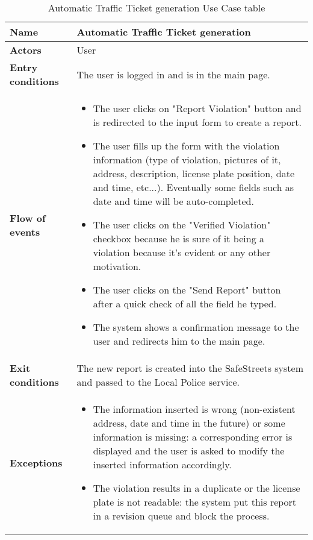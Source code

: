 \begin{table}[!htbp]
	\hypertarget{tab:AutomaticTrafficTicket}{}
	\centering
	\begin{tabular}{lp{10cm}}
\bf\large Name&\bf\large Automatic Traffic Ticket generation\\
\hline
\hline
\bf Actors&User\\
\hline
\bf Entry conditions&The user is logged in and is in the main page.\\
\hline
\bf Flow of events&
\begin{itemize}
\itemsep0em 
\item The user clicks on "Report Violation" button and is redirected to the input form to create a report.

\item The user fills up the form with the violation information (type of violation, pictures of it, address, description, license plate position, date and time, etc...). Eventually some fields such as date and time will be auto-completed.

\item The user clicks on the "Verified Violation" checkbox because he is sure of it being a violation because it's evident or any other motivation.

\item The user clicks on the "Send Report" button after a quick check of all the field he typed.

\item The system shows a confirmation message to the user and redirects him to the main page.

\end{itemize}
\\
\hline
\bf Exit conditions&The new report is created into the SafeStreets system and passed to the Local Police service.\\
\hline
\bf Exceptions&
\setlist{nolistsep}
\begin{itemize}
	\itemsep0em 
	\item The information inserted is wrong (non-existent address, date and time in the future) or some information is missing: a corresponding error is displayed and the user is asked to modify the inserted information accordingly.
	\item The violation results in a duplicate or the license plate is not readable: the system put this report in a revision queue and block the process.
\end{itemize}
\\
\hline

\end{tabular}
\caption{Automatic Traffic Ticket generation Use Case table}
 \label{tab:AutomaticTrafficTicket}
\end{table}